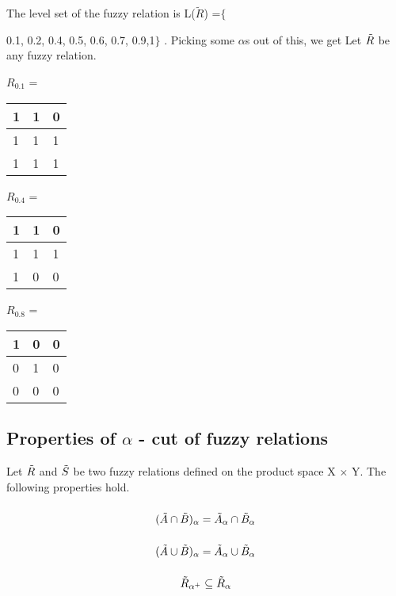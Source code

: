 \documentclass{article}
\begin{document}
The level set of the fuzzy relation is L($\tilde{R}$) =$\{${0.1, 0.2, 0.4, 0.5, 0.6, 0.7, 0.9,1$\}$ . Picking some $\alpha$s out of this, we get
Let $\Tilde{R}$ be any fuzzy relation.
\begin{center}
$R_{0.1}$ =
\def\arraystretch{1.4}%
\begin{tabular}{ | m{1cm} | m{1cm}| m{1cm} | } 
  \hline
  1 & 1 &0  \\ 
  \hline
    1& 1 &1  \\ 
  \hline
   1&1  & 1 \\ 
  \hline
\end{tabular}
\end{center}
\begin{center}
$R_{0.4}$ =
\def\arraystretch{1.4}%
\begin{tabular}{ | m{1cm} | m{1cm}| m{1cm} | } 
  \hline
  1 & 1 &0  \\ 
  \hline
    1& 1 &1  \\ 
  \hline
   1&0  & 0 \\ 
  \hline
\end{tabular}
\end{center}
\begin{center}
$R_{0.8}$ =
\def\arraystretch{1.4}%
\begin{tabular}{ | m{1cm} | m{1cm}| m{1cm} | } 
  \hline
  1 & 0 &0  \\ 
  \hline
    0& 1 &0  \\ 
  \hline
   0&0  & 0 \\ 
  \hline
\end{tabular}
\end{center}
\subsection{Properties of $\alpha$ - cut of fuzzy relations}
Let $\Tilde{R}$ and $\Tilde{S}$ be two fuzzy relations defined on the product space X $\times$ Y. The following properties hold.
\subsubsection{}
\[(\Tilde{A}\cap\Tilde{B})_\alpha = \Tilde{A}_\alpha \cap \Tilde{B}_\alpha\]
\subsubsection{}
\[(\Tilde{A}\cup\Tilde{B})_\alpha = \Tilde{A}_\alpha \cup \Tilde{B}_\alpha\]
\subsubsection{}
\[\Tilde{R}_{\alpha^+}\subseteq\Tilde{R}_\alpha\]
}
\end{document}
